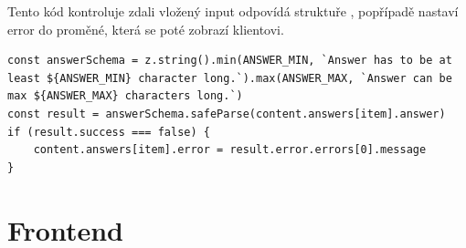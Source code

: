 \documentclass[12pt, a4paper,
openright
]{report}
\let\oldchapter\chapter
\renewcommand{\chapter}{
	\clearpage
	\pagestyle{fancy}
	\oldchapter
}
\begin{document}
Tento kód kontroluje zdali vložený input odpovídá struktuře , popřípadě nastaví error do proměné, která se poté zobrazí klientovi.

\begin{lstlisting}[style=ES6, caption=Validace vstupu pomocí validační knihovny Zod, label=zod]
const answerSchema = z.string().min(ANSWER_MIN, `Answer has to be at least ${ANSWER_MIN} character long.`).max(ANSWER_MAX, `Answer can be max ${ANSWER_MAX} characters long.`)
const result = answerSchema.safeParse(content.answers[item].answer)
if (result.success === false) {
	content.answers[item].error = result.error.errors[0].message
}
\end{lstlisting}


\chapter{Frontend}
\end{document}

